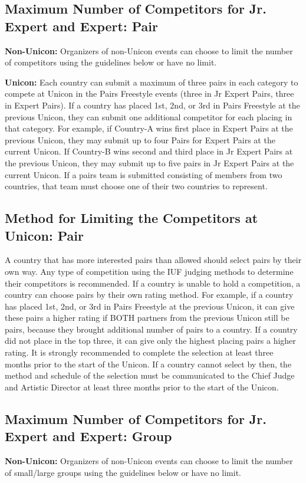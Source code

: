 \subsection{Maximum Number of Competitors for Jr. Expert and Expert: Pair}
\textbf{Non-Unicon:} Organizers of non-Unicon events can choose to limit the number of competitors using the guidelines below or have no limit.

\textbf{Unicon:} Each country can submit a maximum of three pairs in each category to compete at Unicon in the Pairs Freestyle events (three in Jr Expert Pairs, three in Expert Pairs).
If a country has placed 1st, 2nd, or 3rd in Pairs Freestyle at the previous Unicon, they can submit one additional competitor for each placing in that category.
For example, if Country-A wins first place in Expert Pairs at the previous Unicon, they may submit up to four Pairs for Expert Pairs at the current Unicon.
If Country-B wins second and third place in Jr Expert Pairs at the previous Unicon, they may submit up to five pairs in Jr Expert Pairs at the current Unicon.
If a pairs team is submitted consisting of members from two countries, that team must choose one of their two countries to represent.

\subsection{Method for Limiting the Competitors at Unicon: Pair}
A country that has more interested pairs than allowed should select pairs by their own way.
Any type of competition using the IUF judging methods to determine their competitors is recommended.
If a country is unable to hold a competition, a country can choose pairs by their own rating method.
For example, if a country has placed 1st, 2nd, or 3rd in Pairs Freestyle at the previous Unicon, it can give these pairs a higher rating if BOTH partners from the previous Unicon still be pairs, because they brought additional number of pairs to a country.
If a country did not place in the top three, it can give only the highest placing pairs a higher rating.
It is strongly recommended to complete the selection at least three months prior to the start of the Unicon.
If a country cannot select by then, the method and schedule of the selection must be communicated to the Chief Judge and Artistic Director at least three months prior to the start of the Unicon.

\subsection{Maximum Number of Competitors for Jr. Expert and Expert: Group}
\textbf{Non-Unicon:} Organizers of non-Unicon events can choose to limit the number of small/large groups using the guidelines below or have no limit.

